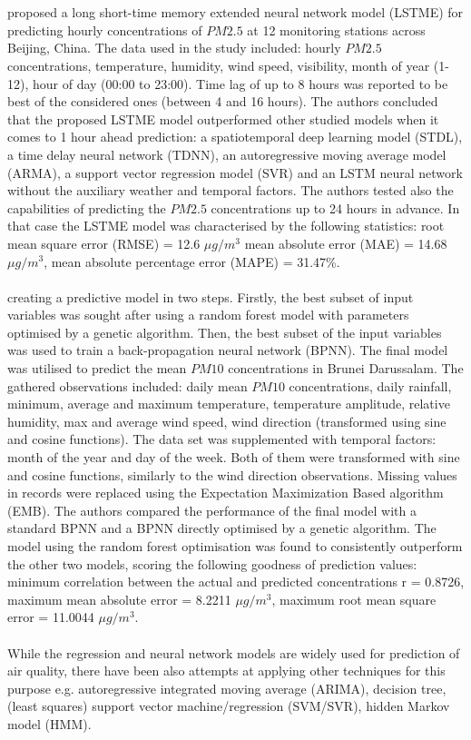 \\\\
\cite{LI2017997} proposed a long short-time memory extended neural network model (LSTME) for predicting hourly concentrations of $PM2.5$ at 12 monitoring stations across Beijing, China. The data used in the study included: hourly $PM2.5$ concentrations, temperature, humidity, wind speed, visibility, month of year (1-12), hour of day (00:00 to 23:00). Time lag of up to 8 hours was reported to be best of the considered ones (between 4 and 16 hours). 
The authors concluded that the proposed LSTME model outperformed other studied models when it comes to 1 hour ahead prediction: a spatiotemporal deep learning model (STDL), a time delay neural network (TDNN), an autoregressive moving average model (ARMA), a support vector regression model (SVR) and an LSTM neural network without the auxiliary weather and temporal factors. The authors tested also the capabilities of predicting the $PM2.5$ concentrations up to 24 hours in advance. In that case the LSTME model was characterised by the following statistics: root mean square error (RMSE) = 12.6 $\mu g / m^3$ mean absolute error (MAE) = 14.68 $\mu g / m^3$, mean absolute percentage error (MAPE) = 31.47\%.
\\\\
\cite{DOTSE2018358} creating a predictive model in two steps. Firstly, the best subset of input variables was sought after using a random forest model with parameters optimised by a genetic algorithm. Then, the best subset of the input variables was used to train a back-propagation neural network (BPNN).
The final model was utilised to predict the mean $PM10$ concentrations in Brunei Darussalam. The gathered observations included: daily mean $PM10$ concentrations, daily rainfall, minimum, average and maximum temperature, temperature amplitude, relative humidity, max and average wind speed, wind direction (transformed using sine and cosine functions). The data set was supplemented with temporal factors: month of the year and day of the week. Both of them were transformed with sine and cosine functions, similarly to the wind direction observations. Missing values in records were replaced using the Expectation Maximization Based algorithm (EMB).
The authors compared the performance of the final model with a standard BPNN and a BPNN directly optimised by a genetic algorithm. The model using the random forest optimisation was found to consistently outperform the other two models, scoring the following goodness of prediction values: minimum correlation between the actual and predicted concentrations r = 0.8726, maximum mean absolute error = 8.2211 $\mu g / m^3$, maximum root mean square error = 11.0044 $\mu g / m^3$.
\\\\
While the regression and neural network models are widely used for prediction of air quality, there have been also attempts at applying other techniques for this purpose e.g. autoregressive integrated moving average (ARIMA), decision tree, (least squares) support vector machine/regression (SVM/SVR), hidden Markov model (HMM). 

